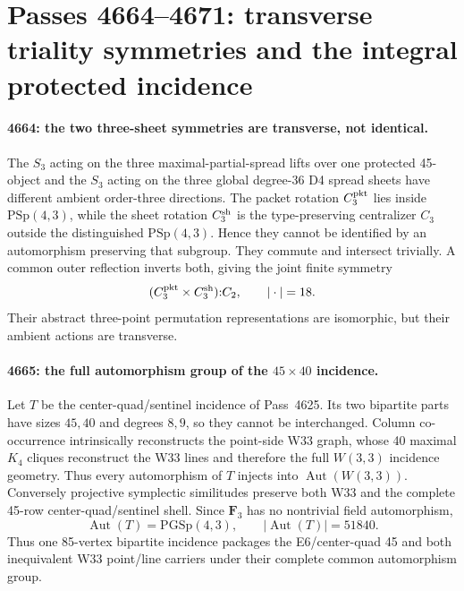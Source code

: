 \section{Passes 4664--4671: transverse triality symmetries and the integral protected incidence}
\label{sec:pass4664-4671}

\paragraph{4664: the two three-sheet symmetries are transverse, not identical.}
The $S_3$ acting on the three maximal-partial-spread lifts over one protected
45-object and the $S_3$ acting on the three global degree-36 D4 spread sheets
have different ambient order-three directions.  The packet rotation
$C_3^{\rm pkt}$ lies inside $\mathrm{PSp}(4,3)$, while the sheet rotation
$C_3^{\rm sh}$ is the type-preserving centralizer $C_3$ outside the distinguished
$\mathrm{PSp}(4,3)$.  Hence they cannot be identified by an automorphism preserving
that subgroup.  They commute and intersect trivially.  A common outer reflection
inverts both, giving the joint finite symmetry
\[
 (C_3^{\rm pkt}\times C_3^{\rm sh}){:}C_2,
 \qquad |\cdot|=18.
\]
Their abstract three-point permutation representations are isomorphic, but their
ambient actions are transverse.

\paragraph{4665: the full automorphism group of the $45\times40$ incidence.}
Let $T$ be the center-quad/sentinel incidence of Pass~4625.  Its two bipartite
parts have sizes $45,40$ and degrees $8,9$, so they cannot be interchanged.
Column co-occurrence intrinsically reconstructs the point-side W33 graph, whose
40 maximal $K_4$ cliques reconstruct the W33 lines and therefore the full
$W(3,3)$ incidence geometry.  Thus every automorphism of $T$ injects into
$\operatorname{Aut}(W(3,3))$.  Conversely projective symplectic similitudes
preserve both W33 and the complete 45-row center-quad/sentinel shell.  Since
$\mathbf F_3$ has no nontrivial field automorphism,
\[
 \boxed{\operatorname{Aut}(T)=\mathrm{PGSp}(4,3),\qquad |\operatorname{Aut}(T)|=51840.}
\]
Thus one 85-vertex bipartite incidence packages the E6/center-quad 45 and both
inequivalent W33 point/line carriers under their complete common automorphism group.

